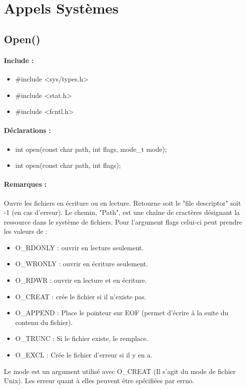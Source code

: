 \documentclass{article}[12pt]
\begin{document}
\section{Appels Systèmes}
\subsection{Open()}
\paragraph{Include : }
\begin{itemize}
	\item \#include <sys/types.h>
	\item \#include <stat.h>
	\item \#include <fcntl.h>
\end{itemize}
\paragraph{Déclarations : }
\begin{itemize}
	\item int open(const char \* path, int flags, mode\_t mode);
	\item int open(const char \* path, int flags);
\end{itemize}
\paragraph{Remarques : }
Ouvre les fichiers en écriture ou en lecture. Retourne soit le "file descriptor" soit -1 (en cas d'erreur). Le chemin, "Path", est une chaîne de cractères désignant la ressource dans le système de fichiers. Pour l'argument flags celui-ci peut prendre les valeurs de :
\begin{itemize}
	\item O\_RDONLY : ouvrir en lecture seulement.
	\item O\_WRONLY : ouvrir en écriture seulement.
	\item O\_RDWR : ouvrir en lecture et en écriture.
	\item O\_CREAT : crée le fichier si il n'existe pas.
	\item O\_APPEND : Place le pointeur sur EOF (permet d'écrire à la suite du contenu du fichier).
	\item O\_TRUNC : Si le fichier existe, le remplace.
	\item O\_EXCL : Crée le fichier d'erreur si il y en a.
\end{itemize}
Le mode est un argument utilisé avec O\_CREAT (Il s'agit du mode de fichier Unix). Les erreur quant à elles peuvent être spécifiées par errno.
\end{document}
